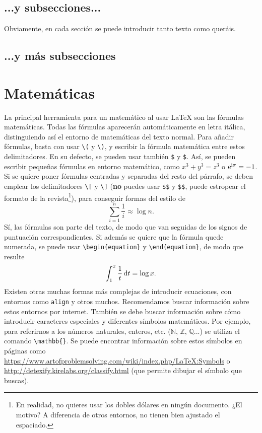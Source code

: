 \documentclass[bibtex, anon]{TEMat-article}
\begin{document}
\subsection{...y subsecciones...}

Obviamente, en cada sección se puede introducir tanto texto como queráis.

\subsection{...y más subsecciones}

\section{Matemáticas}

La principal herramienta para un matemático al usar \LaTeX{} son las fórmulas matemáticas.
Todas las fórmulas aparecerán automáticamente en letra itálica, distinguiendo así el entorno de matemáticas del texto normal.
Para añadir fórmulas, basta con usar \verb+\(+ y \verb+\)+, y escribir la fórmula matemática entre estos delimitadores.
En su defecto, se pueden usar también \verb+$+ y \verb+$+.
Así, se pueden escribir pequeñas fórmulas en entorno matemático, como \(x^3+y^3=z^3\) o $\mathrm{e}^{\mathrm{i}\pi}=-1$.
Si se quiere poner fórmulas centradas y separadas del resto del párrafo, se deben emplear los delimitadores \verb+\[+ y \verb+\]+ (\textbf{no} puedes usar \verb+$$+ y \verb+$$+, puede estropear el formato de la revista\footnote{En realidad, no quieres usar los dobles dólares en ningún documento. ¿El motivo? A diferencia de otros entornos, no tienen bien ajustado el espaciado.}), para conseguir formas del estilo de
\[\sum_{i=1}^n\frac{1}{i}\approx\log n.\]
Sí, las fórmulas son parte del texto, de modo que van seguidas de los signos de puntuación correspondientes.
Si además se quiere que la fórmula quede numerada, se puede usar \verb+\begin{equation}+ y \verb+\end{equation}+, de modo que resulte
\begin{equation}\label{equa:ejemplo1}
\int_{1}^x\frac{1}{t} \mathop{}\!\mathrm{d} t = \log x.
\end{equation}
Existen otras muchas formas más complejas de introducir ecuaciones, con entornos como \verb+align+ y otros muchos.
Recomendamos buscar información sobre estos entornos por internet.
También se debe buscar información sobre cómo introducir caracteres especiales y diferentes símbolos matemáticos.
Por ejemplo, para referirnos a los números naturales, enteros, etc. ($\mathbb{N}$, $\mathbb{Z}$, $\mathbb{Q}$...) se utiliza el comando \verb+\mathbb{}+.
Se puede encontrar información sobre estos símbolos en páginas como \url{https://www.artofproblemsolving.com/wiki/index.php/LaTeX:Symbols} o \url{http://detexify.kirelabs.org/classify.html} (que permite dibujar el símbolo que buscas).
\end{document}
